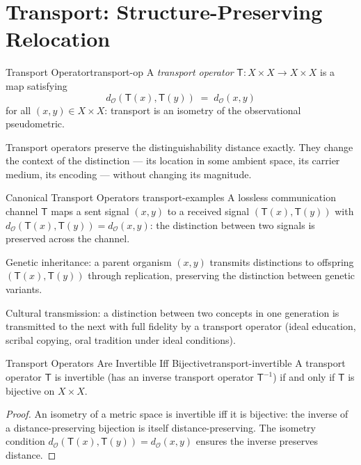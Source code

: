 \documentclass[12pt,twoside,openright]{book}
\newcommand{\distPairs}{X\times X}
\newcommand{\distMetric}{d_{\mathcal{O}}}
\providecommand{\transpOp}{\mathsf{T}}
\begin{document}
\section{Transport: Structure-Preserving Relocation}

\begin{definition}{Transport Operator}{transport-op}
A \emph{transport operator} $\transpOp:\distPairs\to\distPairs$
is a map satisfying
\[
  \distMetric(\transpOp(x),\transpOp(y))
  \;=\;
  \distMetric(x,y)
\]
for all $(x,y)\in\distPairs$: transport is an isometry of the
observational pseudometric.
\end{definition}

Transport operators preserve the distinguishability distance
exactly. They change the context of the distinction --- its
location in some ambient space, its carrier medium, its
encoding --- without changing its magnitude.

\begin{example}{Canonical Transport Operators}%
  {transport-examples}
A lossless communication channel $\transpOp$ maps a sent
signal $(x,y)$ to a received signal $(\transpOp(x),\transpOp(y))$
with $\distMetric(\transpOp(x),\transpOp(y))=\distMetric(x,y)$:
the distinction between two signals is preserved across the
channel.

Genetic inheritance: a parent organism $(x,y)$ transmits
distinctions to offspring $(\transpOp(x),\transpOp(y))$
through replication, preserving the distinction between genetic
variants.

Cultural transmission: a distinction between two concepts in
one generation is transmitted to the next with full fidelity
by a transport operator (ideal education, scribal copying,
oral tradition under ideal conditions).
\end{example}

\begin{proposition}{Transport Operators Are Invertible Iff
  Bijective}{transport-invertible}
A transport operator $\transpOp$ is invertible (has an inverse
transport operator $\transpOp^{-1}$) if and only if $\transpOp$
is bijective on $\distPairs$.
\begin{proof}
An isometry of a metric space is invertible iff it is bijective:
the inverse of a distance-preserving bijection is itself
distance-preserving. The isometry condition
$\distMetric(\transpOp(x),\transpOp(y))=\distMetric(x,y)$
ensures the inverse preserves distance.
\end{proof}
\end{proposition}
\end{document}
